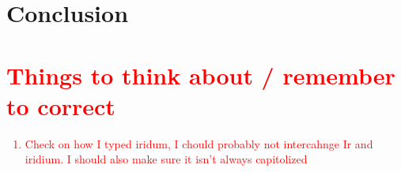 \documentclass[review]{elsarticle}
\begin{document}
	\section{Conclusion}




	
	
	\section{\textcolor{red}{Things to think about / remember to correct}}
		\textcolor{red}{
			\begin{enumerate}
				\item Check on how I typed iridum, I chould probably not intercahnge Ir and iridium. I should also make sure it isn't always capitolized
			\end{enumerate}
		}

	
	
\end{document}
